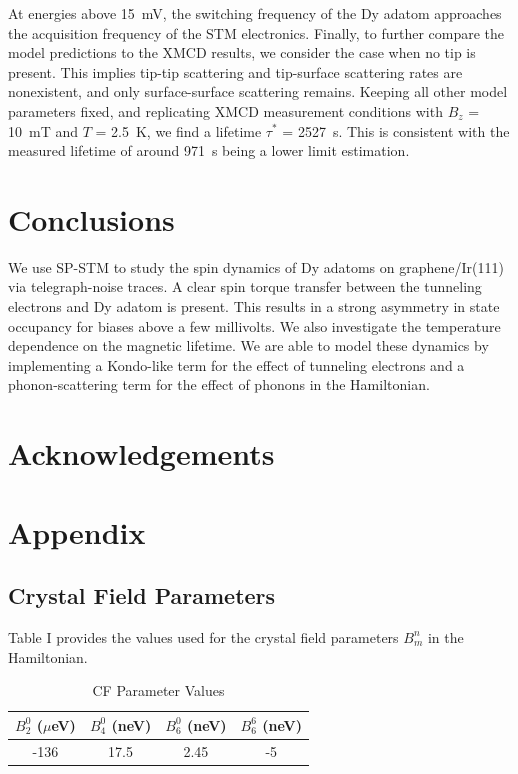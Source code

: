 \documentclass[
reprint,amsmath,amssymb,aps]{revtex4-2}
\begin{document}
At energies above 15~mV, the switching frequency of the Dy adatom approaches the acquisition frequency of the STM electronics.
Finally, to further compare the model predictions to the XMCD results, we consider the case when no tip is present. This implies tip-tip scattering and tip-surface scattering rates are nonexistent, and only surface-surface scattering remains. Keeping all other model parameters fixed, and replicating XMCD measurement conditions with $B_{z}$ = 10~mT and $T$ = 2.5~K, we find a lifetime $\tau^*$ = 2527~s. This is consistent with the measured lifetime of around 971~s being a lower limit estimation.

\section{Conclusions}

We use SP-STM to study the spin dynamics of Dy adatoms on graphene/Ir(111) via telegraph-noise traces. A clear spin torque transfer between the tunneling electrons and Dy adatom is present. This results in a strong asymmetry in state occupancy for biases above a few millivolts. We also investigate the temperature dependence on the magnetic lifetime. We are able to model these dynamics by implementing a Kondo-like term for the effect of tunneling electrons and a phonon-scattering term for the effect of phonons in the Hamiltonian. 
\section{Acknowledgements}
\section{Appendix}
\subsection{Crystal Field Parameters}
\label{app:CF_param}
Table I provides the values used for the crystal field parameters $B^{n}_{m}$ in the Hamiltonian. 
\renewcommand{\arraystretch}{2} 
\begin{table}[h!]
\centering
 \begin{tabular}{cccc}
 \hline
 \hline
 $B^{0}_{2}$ ($\mu$eV) & $B^{0}_{4}$ (neV) & $B^{0}_{6}$ (neV) & $B^{6}_{6}$ (neV) 
 \\ [1ex] 
 \hline 
 -136 & 17.5 & 2.45 & -5 \\
 \hline
 \hline
 \end{tabular}
 \caption{CF Parameter Values}
\end{table}
  
\end{document}
